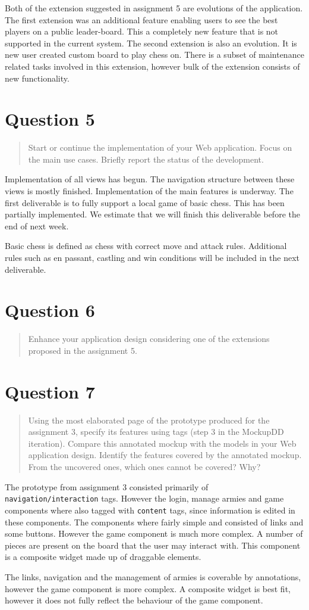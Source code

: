 \documentclass[10pt,a4paper]{report}
\begin{document}
Both of the extension suggested in assignment 5 are evolutions of the application. The first extension was an additional feature enabling users to see the best players on a public leader-board. This a completely new feature that is not supported in the current system. The second extension is also an evolution. It is new user created custom board to play chess on. There is a subset of maintenance related tasks involved in this extension, however bulk of the extension consists of new functionality.

\section{Question 5}
\begin{quote}
Start or continue the implementation of your Web application. Focus on the main use cases. Briefly report the status of the development.
\end{quote}
Implementation of all views has begun. The navigation structure between these views is mostly finished. Implementation of the main features is underway. The first deliverable is to fully support a local game of basic chess. This has been partially implemented. We estimate that we will finish this deliverable before the end of next week.

Basic chess is defined as chess with correct move and attack rules. Additional rules such as en passant, castling and win conditions will be included in the next deliverable.

\section{Question 6}
\begin{quote}
Enhance your application design considering one of the extensions proposed in the assignment 5.
\end{quote}


\section{Question 7}
\begin{quote}
Using the most elaborated page of the prototype produced for the assignment 3, specify its features using tags (step 3 in the MockupDD iteration). Compare this annotated mockup with the models in your Web application design. Identify the features covered by the annotated mockup. From the uncovered ones, which ones cannot be covered? Why?
\end{quote}
The prototype from assignment 3 consisted primarily of \texttt{navigation/interaction} tags. However the login, manage armies and game components where also tagged with \texttt{content} tags, since information is edited in these components. The components where fairly simple and consisted of links and some buttons. However the game component is much more complex. A number of pieces are present on the board that the user may interact with. This component is a composite widget made up of draggable elements.

The links, navigation and the management of armies is coverable by annotations, however the game component is more complex. A composite widget is best fit, however it does not fully reflect the behaviour of the game component.
\end{document}
